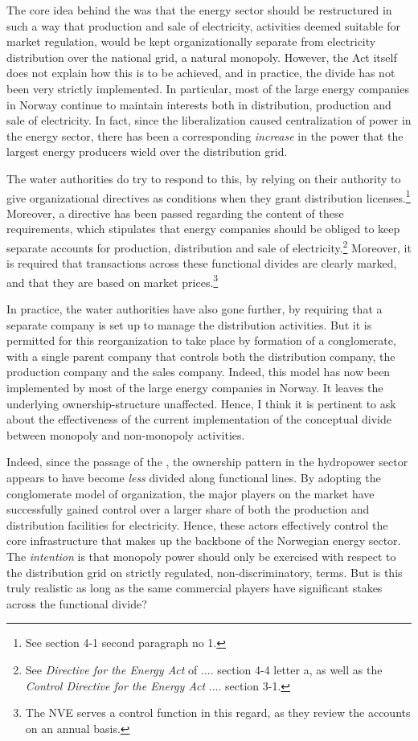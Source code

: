 The core idea behind the \cite{ea90} was that the energy sector should be restructured in such a way that production and sale of electricity, activities deemed suitable for market regulation, would be kept organizationally separate from electricity distribution over the national grid, a natural monopoly. However, the Act itself does not explain how this is to be achieved, and in practice, the divide has not been very strictly implemented. In particular, most of the large energy companies in Norway continue to maintain interests both in distribution, production and sale of electricity. In fact, since the liberalization caused centralization of power in the energy sector, there has been a corresponding {\it increase} in the power that the largest energy producers wield over the distribution grid. 

The water authorities do try to respond to this, by relying on their authority to give organizational directives as conditions when they grant distribution licenses.\footnote{See \cite{ea90} section 4-1 second paragraph no 1.} Moreover, a directive has been passed regarding the content of these requirements, which stipulates that energy companies should  be obliged to keep separate accounts for production, distribution and sale of electricity.\footnote{See {\it Directive for the Energy Act} of .... section 4-4 letter a, as well as the {\it Control Directive for the Energy Act}  .... section 3-1.} Moreover, it is required that transactions across these functional divides are clearly marked, and that they are based on market prices.\footnote{The NVE serves a control function in this regard, as they review the accounts on an annual basis.} 

In practice, the water authorities have also gone further, by requiring that a separate company is set up to manage the distribution activities. But it is permitted for this reorganization to take place by formation of a conglomerate, with a single parent company that controls both the distribution company, the production company and the sales company. Indeed, this model has now been implemented by most of the large energy companies in Norway. It leaves the underlying ownership-structure unaffected. Hence, I think it is pertinent to ask about the effectiveness of the current implementation of the conceptual divide between monopoly and non-monopoly activities. 

Indeed, since the passage of the \cite{ea90}, the ownership pattern in the hydropower sector appears to have become {\it less} divided along functional lines. By adopting the conglomerate model of organization, the major players on the market have successfully gained control over a larger share of both the production and distribution facilities for electricity. Hence, these actors effectively control the core infrastructure that makes up the backbone of the Norwegian energy sector. The {\it intention} is that monopoly power should only be exercised with respect to the distribution grid on strictly regulated, non-discriminatory, terms. But is this truly realistic as long as the same commercial players have significant stakes across the functional divide?

